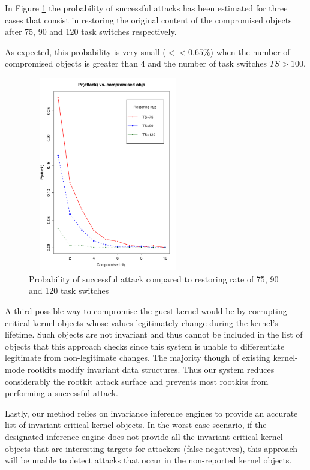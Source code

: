 In Figure \ref{probts} the probability of successful attacks has been estimated for three cases that consist in restoring the original content of the compromised objects after 75, 90 and 120 task switches respectively.

As expected, this probability is very small ($<< 0.65\%$) when the number of compromised objects is greater than 4 and the number of task switches $TS>100$.



\begin{figure}[htbp]
\begin{center}
\includegraphics[width=70mm, height=85mm]{images/hr_sim_1000_ts}
\caption{{Probability of successful attack compared to restoring rate of 75, 90 and 120 task switches}}
\label{probts}
\end{center}
\end{figure}



A third possible way to compromise the guest kernel would be by corrupting critical kernel objects whose values legitimately change during the kernel's lifetime. Such objects are not invariant and thus cannot  be included in the list of objects that this approach checks since this system is unable to differentiate legitimate from non-legitimate changes. The majority though of existing kernel-mode rootkits modify invariant data structures. Thus our system reduces considerably the rootkit attack surface and prevents most rootkits from performing a successful attack.

Lastly, our method relies on invariance inference engines to provide an accurate list of invariant critical kernel objects. In the worst case scenario, if the designated inference engine does not provide all the invariant critical kernel objects that are interesting targets for attackers (false negatives), this approach will be unable to detect attacks that occur in the non-reported kernel objects.

